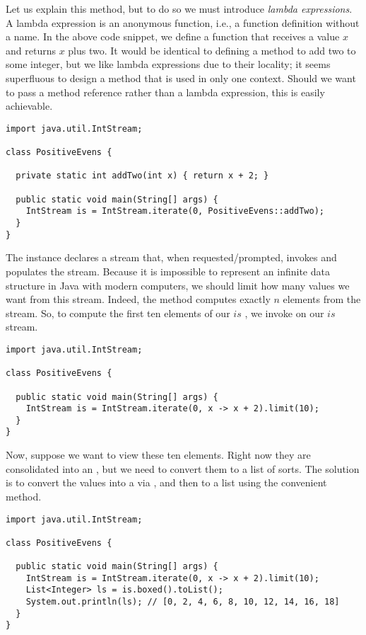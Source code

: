 Let us explain this method, but to do so we must introduce \textit{lambda expressions}. A lambda expression is an anonymous function, i.e., a function definition without a name. In the above code snippet, we define a function that receives a value $x$ and returns $x$ plus two. It would be identical to defining a  method to add two to some integer, but we like lambda expressions due to their locality; it seems superfluous to design a method that is used in only one context. Should we want to pass a method reference rather than a lambda expression, this is easily achievable.
\begin{cl}[]{}
\begin{lstlisting}[language=MyJava]
import java.util.IntStream;

class PositiveEvens {

  private static int addTwo(int x) { return x + 2; }

  public static void main(String[] args) {
    IntStream is = IntStream.iterate(0, PositiveEvens::addTwo);
  }
}   
\end{lstlisting}
\end{cl}

The  instance declares a stream that, when requested/prompted, invokes and populates the stream. Because it is impossible to represent an infinite data structure in Java with modern computers, we should limit how many values we want from this stream. Indeed, the  method computes exactly $n$ elements from the stream. So, to compute the first ten elements of our $\textit{is}$ , we invoke  on our $\textit{is}$ stream. 

\begin{cl}[]{}
\begin{lstlisting}[language=MyJava]
import java.util.IntStream;

class PositiveEvens {
  
  public static void main(String[] args) {
    IntStream is = IntStream.iterate(0, x -> x + 2).limit(10);
  }
}
\end{lstlisting}
\end{cl}
Now, suppose we want to view these ten elements. Right now they are consolidated into an , but we need to convert them to a list of sorts. The solution is to convert the values into a  via , and then to a list using the convenient  method.
\begin{cl}[]{}
\begin{lstlisting}[language=MyJava]
import java.util.IntStream;

class PositiveEvens {
  
  public static void main(String[] args) {
    IntStream is = IntStream.iterate(0, x -> x + 2).limit(10);
    List<Integer> ls = is.boxed().toList();
    System.out.println(ls); // [0, 2, 4, 6, 8, 10, 12, 14, 16, 18]
  }
}
\end{lstlisting}
\end{cl}

